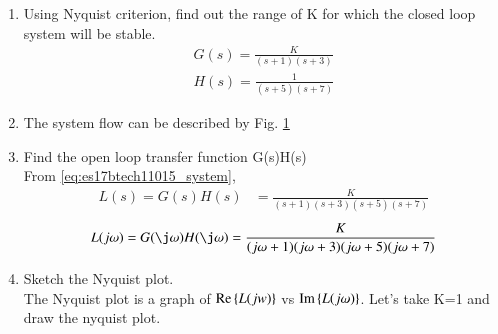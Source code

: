 \begin{enumerate}[label=\thesection.\arabic*.,ref=\thesection.\theenumi]

\item Using Nyquist criterion, find out the range of K for which the closed loop system will be stable.\newline
\begin{align}
\label{eq:es17btech11015_system}
    \nonumber G(s)=\frac{K}{(s+1)(s+3)}
    \\
    H(s)=\frac{1}{(s+5)(s+7)}
\end{align}

\item The system flow can be described by Fig. \ref{fig:es17btech11015_fig1}
\begin{figure}[!ht]
    \begin{center}
        \resizebox{\columnwidth}{!}{}
    \end{center}
    \caption{}  
    \label{fig:es17btech11015_fig1}
\end{figure}
\item Find the open loop transfer function G(s)H(s)
\\
\solution From \eqref{eq:es17btech11015_system},
%
 \begin{align}
 \label{eq:es17btech11015_openloop}
L(s)=G(s)H(s)&=\frac{K}{(s+1)(s+3)(s+5)(s+7)}
 \end{align}
 \begin{align}
L(j\omega)=G(\j \omega)H(\j \omega)=\frac{K}{(j\omega+1)(j\omega+3)(j\omega+5)(j\omega+7)}
\end{align}

\item Sketch the Nyquist plot.
\\
\solution The Nyquist plot is a graph of $\text{Re} \left\{L(jw)\right\}$  vs $\text{Im} \left\{L(j\omega)\right\}$.
Let's take K=1 and draw the nyquist plot.
\\


\end{enumerate}
